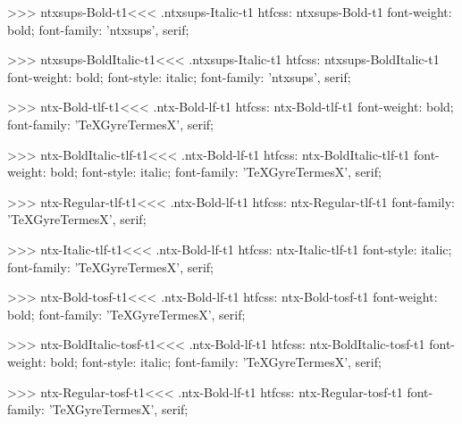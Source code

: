 >>>
\<ntxsups-Bold-t1\><<<
.ntxsups-Italic-t1
htfcss:  ntxsups-Bold-t1  font-weight: bold; font-family: 'ntxsups', serif;

>>>
\<ntxsups-BoldItalic-t1\><<<
.ntxsups-Italic-t1
htfcss:  ntxsups-BoldItalic-t1  font-weight: bold; font-style: italic; font-family: 'ntxsups', serif;

>>>
\<ntx-Bold-tlf-t1\><<<
.ntx-Bold-lf-t1
htfcss:  ntx-Bold-tlf-t1  font-weight: bold; font-family: 'TeXGyreTermesX', serif;

>>>
\<ntx-BoldItalic-tlf-t1\><<<
.ntx-Bold-lf-t1
htfcss:  ntx-BoldItalic-tlf-t1  font-weight: bold; font-style: italic; font-family: 'TeXGyreTermesX', serif;

>>>
\<ntx-Regular-tlf-t1\><<<
.ntx-Bold-lf-t1
htfcss:  ntx-Regular-tlf-t1  font-family: 'TeXGyreTermesX', serif;

>>>
\<ntx-Italic-tlf-t1\><<<
.ntx-Bold-lf-t1
htfcss:  ntx-Italic-tlf-t1  font-style: italic; font-family: 'TeXGyreTermesX', serif;

>>>
\<ntx-Bold-tosf-t1\><<<
.ntx-Bold-lf-t1
htfcss:  ntx-Bold-tosf-t1  font-weight: bold; font-family: 'TeXGyreTermesX', serif;

>>>
\<ntx-BoldItalic-tosf-t1\><<<
.ntx-Bold-lf-t1
htfcss:  ntx-BoldItalic-tosf-t1  font-weight: bold; font-style: italic; font-family: 'TeXGyreTermesX', serif;

>>>
\<ntx-Regular-tosf-t1\><<<
.ntx-Bold-lf-t1
htfcss:  ntx-Regular-tosf-t1  font-family: 'TeXGyreTermesX', serif;

